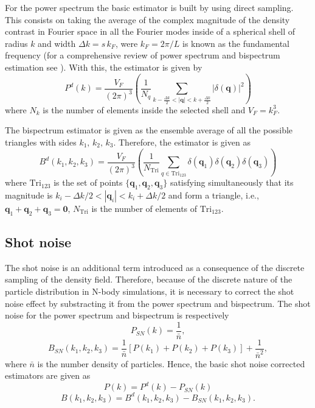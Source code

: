 \documentclass[a4paper,fleqn,usenatbib]{mnras}
\begin{document}
For the power spectrum the basic estimator is built by using direct sampling. 
This consists on taking the average of the complex magnitude of the density
contrast in Fourier space in all the Fourier modes inside of a spherical shell 
of radius $k$ and width $\Delta k= s\,k_F$, were $k_F=2\pi/L$ is known as the 
fundamental frequency (for a comprehensive review of power spectrum and 
bispectrum estimation see \cite{Jeong2010}). With this, the estimator is given
by
\begin{equation}
  P^d(k) = \frac{V_F}{(2\pi)^3} \left( \frac{1}{N_{q}}
  \sum_{k-\frac{\Delta k}{2} < |\mathbf{q}| < k + \frac{\Delta k}{2}}
  |\delta(\mathbf{q})|^2 \right) \label{eq:PkEstimator}
\end{equation}
where $N_k$ is the number of elements inside the selected shell and $V_F=k_F^3$.

The bispectrum estimator is given as the ensemble average of all the possible  
triangles with sides $k_1,\,k_2,\,k_3$. Therefore, the estimator is given as
\begin{equation}
  B^d(k_1,k_2,k_3) = \frac{V_F}{(2\pi)^3}
  \left( 
  \frac{1}{N_\text{Tri}} 
  \sum_{q \in \text{Tri}_{123}} 
  \delta(\mathbf{q}_1) \delta(\mathbf{q}_2) \delta(\mathbf{q}_3) 
  \right) \label{eq:BkEstimator}
\end{equation}
where $\text{Tri}_{123}$ is the set of points $\{\mathbf{q}_1, \mathbf{q}_2, 
\mathbf{q}_3\}$ satisfying simultaneously that its magnitude is $k_i-{\Delta 
k}/{2} < |\mathbf{q}_i| < k_i+{\Delta k}/{2}$ and form a triangle, i.e.,
$\mathbf{q}_1 + \mathbf{q}_2 + \mathbf{q}_3 = \mathbf{0}$, $N_\text{Tri}$ is 
the number of elements of $\text{Tri}_{123}$.


\subsection{Shot noise}

The shot noise is an additional term introduced as a consequence of the 
discrete sampling of the density field. Therefore, because of the discrete 
nature of the particle distribution in N-body simulations, it is necessary to 
correct the shot noise effect by substracting it from the power spectrum and 
bispectrum. The shot noise for the power spectrum and bispectrum is respectively
\begin{equation}
  P_{SN}(k) = \frac{1}{\bar{n}} \label{eq:PSN},
\end{equation}
\begin{equation}
  B_{SN}(k_1,k_2,k_3) = \frac{1}{\bar{n}} 
  \left[ P(k_1) + P(k_2) + P(k_3) \right] + \frac{1}{\bar{n}^2} \label{eq:BSN},
\end{equation}
where $\bar{n}$ is the number density of particles. Hence, the basic shot noise 
corrected estimators are given as
\begin{equation}
  P(k)=P^d(k) - P_{SN}(k)
\end{equation}
\begin{equation}
  B(k_1,k_2,k_3)=B^d(k_1,k_2,k_3)-B_{SN}(k_1,k_2,k_3).
\end{equation}
\end{document}
